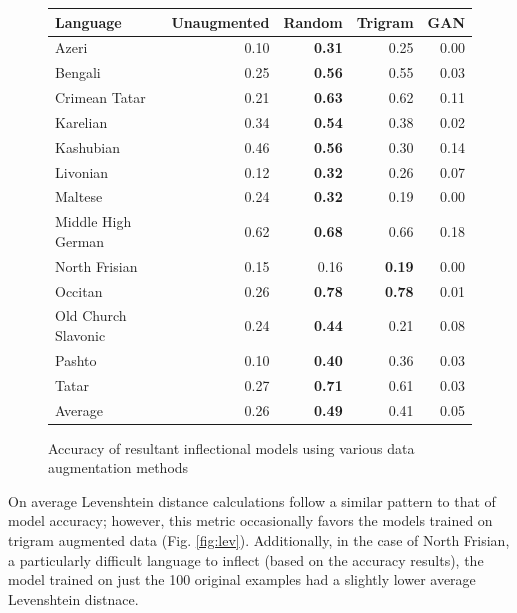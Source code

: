\documentclass{article}
\begin{document}
      \begin{figure}[H]
        \center
        \begin{tabular}{lrrrr}
          \toprule
          Language & Unaugmented & Random & Trigram & GAN \\
          \midrule
          Azeri & 0.10 & \textbf{0.31} & 0.25 & 0.00 \\
          Bengali & 0.25 & \textbf{0.56} & 0.55 & 0.03 \\
          Crimean Tatar & 0.21 & \textbf{0.63} & 0.62 & 0.11 \\
          Karelian & 0.34 & \textbf{0.54} & 0.38 & 0.02 \\
          Kashubian & 0.46 & \textbf{0.56} & 0.30 & 0.14 \\
          Livonian & 0.12 & \textbf{0.32} & 0.26 & 0.07 \\
          Maltese & 0.24 & \textbf{0.32} & 0.19 & 0.00 \\
          Middle High German & 0.62 & \textbf{0.68} & 0.66 & 0.18 \\
          North Frisian & 0.15 & 0.16 & \textbf{0.19} & 0.00 \\
          Occitan & 0.26 & \textbf{0.78} & \textbf{0.78} & 0.01 \\
          Old Church Slavonic & 0.24 & \textbf{0.44} & 0.21 & 0.08 \\
          Pashto & 0.10 & \textbf{0.40} & 0.36 & 0.03\\
          Tatar & 0.27 & \textbf{0.71} & 0.61 & 0.03\\
          \midrule
          Average & 0.26 & \textbf{0.49} & 0.41 & 0.05\\
          \bottomrule
        \end{tabular}
        \caption{Accuracy of resultant inflectional models using various data augmentation methods}
        \label{fig:accuracy}
      \end{figure}

      On average Levenshtein distance calculations follow a similar pattern to that of model accuracy; however, this metric occasionally favors the models trained on trigram augmented data (Fig. \ref{fig:lev}). Additionally, in the case of North Frisian, a particularly difficult language to inflect (based on the accuracy results), the model trained on just the 100 original examples had a slightly lower average Levenshtein distnace.
    
\end{document}
